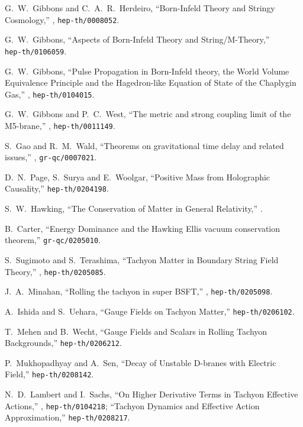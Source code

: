 \documentclass[a4paper,12pt]{article}
\begin{document}
\begin{thebibliography}{99}
 G.\ W.\ Gibbons and C.\ A.\ R.\
Herdeiro, ``Born-Infeld Theory and Stringy Cosmology,'' 
,  {\tt hep-th/0008052}.

 G.\ W.\ Gibbons, 
``Aspects of Born-Infeld Theory and String/M-Theory,'' \\
{\tt hep-th/0106059}.

 G.\ W.\ Gibbons, ``Pulse Propagation in Born-Infeld
theory, the World Volume Equivalence Principle and the Hagedron-like
Equation of State of the Chaplygin Gas,'' 
,  {\tt hep-th/0104015}.

 G.\ W.\ Gibbons and P.\ C.\ West, 
``The metric and strong coupling limit of the M5-brane,'' 
,  {\tt hep-th/0011149}.


 S.\ Gao and R.\ M.\ Wald, 
``Theorems on  gravitational time delay and related issues,'' 
,  {\tt gr-qc/0007021}.

 D.\ N.\ Page, S.\ Surya and E.\ Woolgar, 
``Positive Mass from Holographic Causality,'' 
{\tt hep-th/0204198}.

 S.\ W.\ Hawking, ``The Conservation of Matter in
General Relativity,'' \J{Comm.\ Math.\ Phys.}{18}{1970}{303}.

 B.\ Carter, ``Energy Dominance and the Hawking
Ellis vacuum conservation theorem,'' {\tt gr-qc/0205010}.

S.\ Sugimoto and S.\ Terashima, 
``Tachyon Matter in Boundary String Field Theory,''
,
{\tt hep-th/0205085}.

J.\ A.\ Minahan, 
``Rolling the tachyon in super BSFT,''
, {\tt hep-th/0205098}.


A.\ Ishida and S.\ Uehara,
``Gauge Fields on Tachyon Matter,''  {\tt hep-th/0206102}. 

T.\ Mehen and B.\ Wecht, 
``Gauge Fields and Scalars in Rolling Tachyon Backgrounds,''
{\tt hep-th/0206212}.

P.~Mukhopadhyay and A.~Sen,
``Decay of Unstable D-branes with Electric Field,''
{\tt hep-th/0208142}.

N.\ D.\ Lambert and I.\ Sachs, 
``On Higher Derivative Terms in Tachyon Effective Actions,''
, {\tt hep-th/0104218};
``Tachyon Dynamics and Effective Action Approximation,''
{\tt hep-th/0208217}.


\end{thebibliography}
\end{document}
